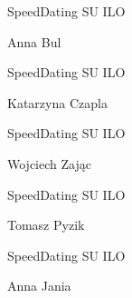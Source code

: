 \documentclass[a4paper,12pt]{article}
\begin{document}
\begin{minipage}[c]{\textwidth}
  \hline

  \hspace{0.5cm}

  SpeedDating SU ILO

  Anna Bul

  \hspace{0.5cm}

  \hline
\end{minipage}



\begin{minipage}[c]{\textwidth}
  \hline

  \hspace{0.5cm}

  SpeedDating SU ILO

  Katarzyna Czapla

  \hspace{0.5cm}

  \hline
\end{minipage}



\begin{minipage}[c]{\textwidth}
  \hline

  \hspace{0.5cm}

  SpeedDating SU ILO

  Wojciech Zając

  \hspace{0.5cm}

  \hline
\end{minipage}



\begin{minipage}[c]{\textwidth}
  \hline

  \hspace{0.5cm}

  SpeedDating SU ILO

  Tomasz Pyzik

  \hspace{0.5cm}

  \hline
\end{minipage}



\begin{minipage}[c]{\textwidth}
  \hline

  \hspace{0.5cm}

  SpeedDating SU ILO

  Anna Jania

  \hspace{0.5cm}

  \hline
\end{minipage}
\end{document}
